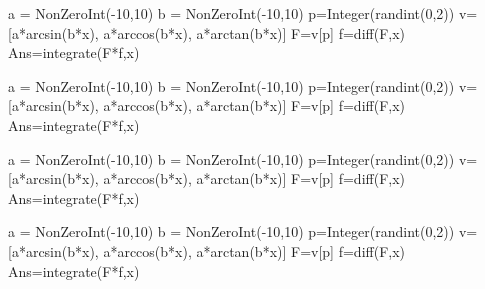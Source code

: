 \documentclass[]{ximera}
\begin{document}
\begin{sagesilent}
a = NonZeroInt(-10,10)
b = NonZeroInt(-10,10)
p=Integer(randint(0,2))
v=[a*arcsin(b*x), a*arccos(b*x), a*arctan(b*x)]
F=v[p]
f=diff(F,x)
Ans=integrate(F*f,x)
\end{sagesilent}


\begin{sagesilent}
a = NonZeroInt(-10,10)
b = NonZeroInt(-10,10)
p=Integer(randint(0,2))
v=[a*arcsin(b*x), a*arccos(b*x), a*arctan(b*x)]
F=v[p]
f=diff(F,x)
Ans=integrate(F*f,x)
\end{sagesilent}


\begin{sagesilent}
a = NonZeroInt(-10,10)
b = NonZeroInt(-10,10)
p=Integer(randint(0,2))
v=[a*arcsin(b*x), a*arccos(b*x), a*arctan(b*x)]
F=v[p]
f=diff(F,x)
Ans=integrate(F*f,x)
\end{sagesilent}


\begin{sagesilent}
a = NonZeroInt(-10,10)
b = NonZeroInt(-10,10)
p=Integer(randint(0,2))
v=[a*arcsin(b*x), a*arccos(b*x), a*arctan(b*x)]
F=v[p]
f=diff(F,x)
Ans=integrate(F*f,x)
\end{sagesilent}
\end{document}
